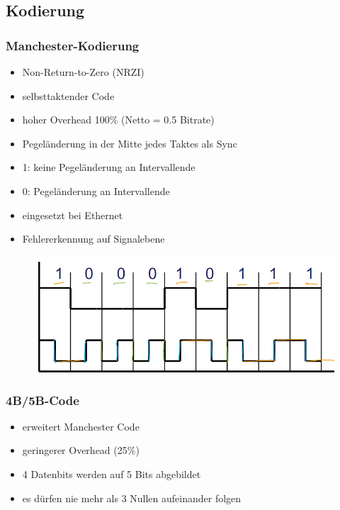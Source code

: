 \documentclass[12pt,a4paper]{article}
\begin{document}
\subsection{Kodierung}
\subsubsection{Manchester-Kodierung}
\begin{itemize}
\item Non-Return-to-Zero (NRZI)
\item selbsttaktender Code
\item hoher Overhead 100\% (Netto = 0.5 Bitrate)
\item Pegeländerung in der Mitte jedes Taktes als Sync
\item 1: keine Pegeländerung an Intervallende
\item 0: Pegeländerung an Intervallende
\item eingesetzt bei Ethernet
\item Fehlererkennung auf Signalebene
\end{itemize}
\begin{figure}[H]
\includegraphics[scale=0.35]{./resources/manchester.png}
\end{figure}

\subsubsection{4B/5B-Code}
\begin{itemize}
\item erweitert Manchester Code
\item geringerer Overhead (25\%)
\item 4 Datenbits werden auf 5 Bits abgebildet
\item es dürfen nie mehr als 3 Nullen aufeinander folgen
\end{itemize}
\end{document}
